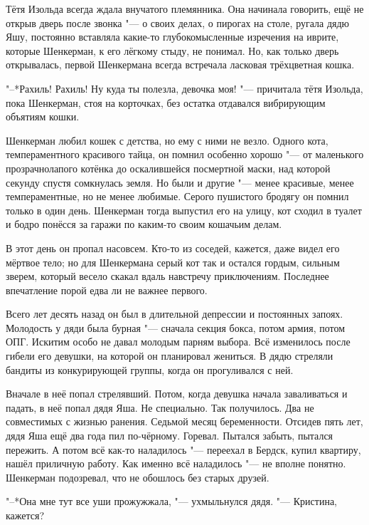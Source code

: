 Тётя Изольда всегда ждала внучатого племянника.
Она начинала говорить, ещё не открыв дверь после звонка "--- о своих делах, о пирогах на столе, ругала дядю Яшу, постоянно вставляла какие-то глубокомысленные изречения на иврите, которые Шенкерман, к его лёгкому стыду, не понимал.
Но, как только дверь открывалась, первой Шенкермана всегда встречала ласковая трёхцветная кошка.

"--*Рахиль!
Рахиль!
Ну куда ты полезла, девочка моя! "--- причитала тётя Изольда, пока Шенкерман, стоя на корточках, без остатка отдавался вибрирующим объятиям кошки.

Шенкерман любил кошек с детства, но ему с ними не везло.
Одного кота, темпераментного красивого тайца, он помнил особенно хорошо "--- от маленького прозрачнолапого котёнка до оскалившейся посмертной маски, над которой секунду спустя сомкнулась земля.
Но были и другие "--- менее красивые, менее темпераментные, но не менее любимые.
Серого пушистого бродягу он помнил только в один день.
Шенкерман тогда выпустил его на улицу, кот сходил в туалет и бодро понёсся за гаражи по каким-то своим кошачьим делам.

В этот день он пропал насовсем.
Кто-то из соседей, кажется, даже видел его мёртвое тело;
но для Шенкермана серый кот так и остался гордым, сильным зверем, который весело скакал вдаль навстречу приключениям.
Последнее впечатление порой едва ли не важнее первого.

\asterism

Всего лет десять назад он был в длительной депрессии и постоянных запоях.
Молодость у дяди была бурная "--- сначала секция бокса, потом армия, потом ОПГ.
Искитим особо не давал молодым парням выбора.
Всё изменилось после гибели его девушки, на которой он планировал жениться.
В дядю стреляли бандиты из конкурирующей группы, когда он прогуливался с ней.

Вначале в неё попал стрелявший.
Потом, когда девушка начала заваливаться и падать, в неё попал дядя Яша.
Не специально.
Так получилось.
Два не совместимых с жизнью ранения.
Седьмой месяц беременности.
Отсидев пять лет, дядя Яша ещё два года пил по-чёрному.
Горевал.
Пытался забыть, пытался пережить.
А потом всё как-то наладилось "--- переехал в Бердск, купил квартиру, нашёл приличную работу.
Как именно всё наладилось "--- не вполне понятно.
Шенкерман подозревал, что не обошлось без старых друзей.

\asterism

"--*Она мне тут все уши прожужжала, "--- ухмыльнулся дядя.
"--- Кристина, кажется?

